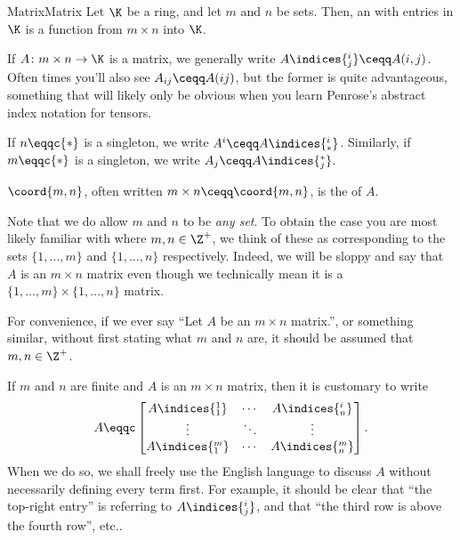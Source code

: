 \begin{dfn}{Matrix}{Matrix}
	Let $\K$ be a ring, and let $m$ and $n$ be sets.  Then, an  with entries in $\K$ is a function from $m\times n$ into $\K$.
	\begin{ntn}[breakable=false]{}{}
		If $A\colon m\times n\rightarrow \K$ is a matrix, we generally write $A\indices{^i_j}\ceqq A(i,j)$.  Often times you'll also see $A_{ij}\ceqq A(ij)$, but the former is quite advantageous, something that will likely only be obvious when you learn Penrose's abstract index notation for tensors.
		
		If $n\eqqc \{ *\}$ is a singleton, we write $A^i\ceqq A\indices{^i_*}$.  Similarly, if $m\eqqc \{ *\}$ is a singleton, we write $A_j\ceqq A\indices{^*_j}$.
	\end{ntn}
	\begin{rmk}
		$\coord{m,n}$, often written $m\times n\ceqq \coord{m,n}$, is the  of $A$.
	\end{rmk}
	\begin{rmk}
		Note that we do allow $m$ and $n$ to be \emph{any set}.  To obtain the case you are most likely familiar with where $m,n\in \Z ^+$, we think of these as corresponding to the sets $\{ 1,\ldots ,m\}$ and $\{ 1,\ldots ,n\}$ respectively.  Indeed, we will be sloppy and say that $A$ is an $m\times n$ matrix even though we technically mean it is a $\{ 1,\ldots ,m\} \times \{ 1,\ldots ,n\}$ matrix.
	\end{rmk}
	\begin{rmk}
		For convenience, if we ever say ``Let $A$ be an $m\times n$ matrix.'', or something similar, without first stating what $m$ and $n$ are, it should be assumed that $m,n\in \Z ^+$.
	\end{rmk}
\end{dfn}
\begin{ntn}{}{}
	If $m$ and $n$ are finite and $A$ is an $m\times n$ matrix, then it is customary to write
	\begin{equation}
	A\eqqc \begin{bmatrix}A\indices{^1_1} & \cdots & A\indices{^i_n} \\ \vdots & \ddots & \vdots \\ A\indices{^m_1} & \cdots & A\indices{^m_n}\end{bmatrix}.
	\end{equation}
	When we do so, we shall freely use the English language to discuss $A$ without necessarily defining every term first.  For example, it should be clear that ``the top-right entry'' is referring to $A\indices{^i_j}$, and that ``the third row is above the fourth row'', etc..
\end{ntn}
